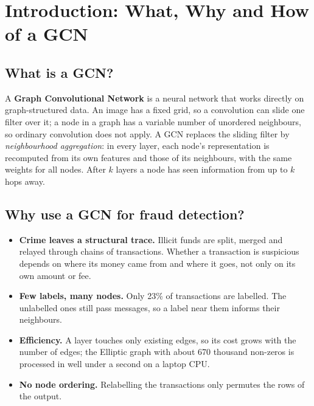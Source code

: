 \documentclass[11pt,a4paper]{article}
\begin{document}
\section{Introduction: What, Why and How of a GCN}
\subsection{What is a GCN?}
A \textbf{Graph Convolutional Network} is a neural network that works directly on graph-structured data. An image has a
fixed grid, so a convolution can slide one filter over it; a node in a graph has a variable number of unordered neighbours,
so ordinary convolution does not apply. A GCN replaces the sliding filter by \emph{neighbourhood aggregation}: in every layer, each
node's representation is recomputed from its own features and those of its neighbours, with the same weights for all nodes.
After $k$ layers a node has seen information from up to $k$ hops away.

\subsection{Why use a GCN for fraud detection?}
\begin{itemize}
  \item \textbf{Crime leaves a structural trace.} Illicit funds are split, merged and relayed through chains of transactions.
        Whether a transaction is suspicious depends on where its money came from and where it goes, not only on its own amount or fee.
  \item \textbf{Few labels, many nodes.} Only 23\% of transactions are labelled. The unlabelled ones still pass messages, so a label
        near them informs their neighbours.
  \item \textbf{Efficiency.} A layer touches only existing edges, so its cost grows with the number of edges; the Elliptic graph with
        about 670 thousand non-zeros is processed in well under a second on a laptop CPU.
  \item \textbf{No node ordering.} Relabelling the transactions only permutes the rows of the output.
\end{itemize}
\end{document}
